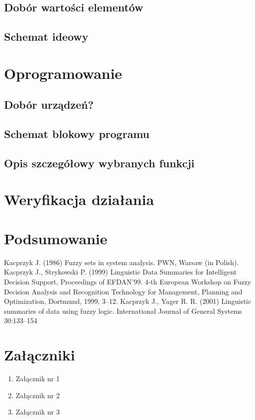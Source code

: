 \documentclass[12pt,a4paper]{report}
\begin{document}
\section{Dobór wartości elementów}
\section{Schemat ideowy}

\chapter{Oprogramowanie}

\section{Dobór urządzeń?}
\section{Schemat blokowy programu}
\section{Opis szczegółowy wybranych funkcji}
\chapter{Weryfikacja działania}
\chapter{Podsumowanie}
\begin{thebibliography}{99}
Kacprzyk J. (1986) Fuzzy sets in system analysis.  PWN, Warsaw (in Polish).
Kacprzyk J., Strykowski P. (1999) Linguistic Data Summaries for Intelligent Decision Support, Proceedings of EFDAN'99. 4-th European Workshop on Fuzzy Decision Analysis and Recognition Technology for Management, Planning and Optimization, Dortmund, 1999, 3--12.
Kacprzyk J., Yager R. R. (2001) Linguistic summaries of data using fuzzy logic. International Journal of General Systems 30:133--154 

\end{thebibliography}

\listoffigures

\listoftables


\chapter*{Załączniki}
\begin{enumerate}
\item Załącznik nr 1
\item Załącznik nr 2
\item Załącznik nr 3
\end{enumerate}
\end{document}
